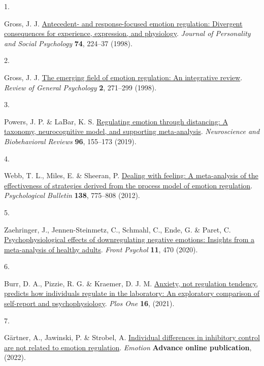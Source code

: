 \documentclass[
  man,floatsintext]{apa6}
\newlength{\cslhangindent}
\newlength{\csllabelwidth}
\newlength{\cslentryspacingunit} %
\newenvironment{CSLReferences}[2] %
 {%
  \setlength{\parindent}{0pt}
  \ifodd #1
  \let\oldpar\par
  \def\par{\hangindent=\cslhangindent\oldpar}
  \fi
  \setlength{\parskip}{#2\cslentryspacingunit}
 }%
 {}
\newcommand{\CSLLeftMargin}[1]{\parbox[t]{\csllabelwidth}{#1}}
\newcommand{\CSLRightInline}[1]{\parbox[t]{\linewidth - \csllabelwidth}{#1}\break}
\begin{document}
\hypertarget{refs}{}
\begin{CSLReferences}{0}{0}
\leavevmode{}%
\CSLLeftMargin{1. }%
\CSLRightInline{Gross, J. J. \href{https://doi.org/10.1037/0022-3514.74.1.224}{Antecedent- and response-focused emotion regulation: Divergent consequences for experience, expression, and physiology}. \emph{Journal of Personality and Social Psychology} \textbf{74}, 224--37 (1998).}

\leavevmode{}%
\CSLLeftMargin{2. }%
\CSLRightInline{Gross, J. J. \href{https://doi.org/10.1037/1089-2680.2.3.271}{The emerging field of emotion regulation: An integrative review}. \emph{Review of General Psychology} \textbf{2}, 271--299 (1998).}

\leavevmode{}%
\CSLLeftMargin{3. }%
\CSLRightInline{Powers, J. P. \& LaBar, K. S. \href{https://doi.org/10.1016/j.neubiorev.2018.04.023}{Regulating emotion through distancing: A taxonomy, neurocognitive model, and supporting meta-analysis}. \emph{Neuroscience and Biobehavioral Reviews} \textbf{96}, 155--173 (2019).}

\leavevmode{}%
\CSLLeftMargin{4. }%
\CSLRightInline{Webb, T. L., Miles, E. \& Sheeran, P. \href{https://doi.org/10.1037/a0027600}{Dealing with feeling: A meta-analysis of the effectiveness of strategies derived from the process model of emotion regulation}. \emph{Psychological Bulletin} \textbf{138}, 775--808 (2012).}

\leavevmode{}%
\CSLLeftMargin{5. }%
\CSLRightInline{Zaehringer, J., Jennen-Steinmetz, C., Schmahl, C., Ende, G. \& Paret, C. \href{https://doi.org/10.3389/fpsyg.2020.00470}{Psychophysiological effects of downregulating negative emotions: Insights from a meta-analysis of healthy adults}. \emph{Front Psychol} \textbf{11}, 470 (2020).}

\leavevmode{}%
\CSLLeftMargin{6. }%
\CSLRightInline{Burr, D. A., Pizzie, R. G. \& Kraemer, D. J. M. \href{https://doi.org/ARTN\%20e0247246\%0A10.1371/journal.pone.0247246}{Anxiety, not regulation tendency, predicts how individuals regulate in the laboratory: An exploratory comparison of self-report and psychophysiology}. \emph{Plos One} \textbf{16}, (2021).}

\leavevmode{}%
\CSLLeftMargin{7. }%
\CSLRightInline{Gärtner, A., Jawinski, P. \& Strobel, A. \href{https://doi.org/10.1037/emo0001135}{Individual differences in inhibitory control are not related to emotion regulation}. \emph{Emotion} \textbf{Advance online publication}, (2022).}


\end{CSLReferences}
\end{document}
